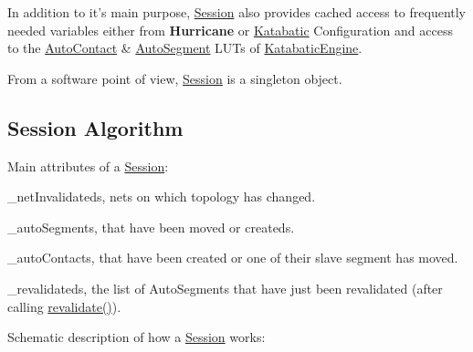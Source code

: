 In addition to it's main purpose, \hyperlink{classKatabatic_1_1Session}{Session} also provides cached access to frequently needed variables either from {\bf Hurricane} or \hyperlink{namespaceKatabatic}{Katabatic} Configuration and access to the \hyperlink{classKatabatic_1_1AutoContact}{Auto\-Contact} \& \hyperlink{classKatabatic_1_1AutoSegment}{Auto\-Segment} L\-U\-Ts of \hyperlink{classKatabatic_1_1KatabaticEngine}{Katabatic\-Engine}.

From a software point of view, \hyperlink{classKatabatic_1_1Session}{Session} is a singleton object.\hypertarget{classKatabatic_1_1Session_secSessionAlgo}{}\subsection{Session Algorithm}\label{classKatabatic_1_1Session_secSessionAlgo}
Main attributes of a \hyperlink{classKatabatic_1_1Session}{Session}\-:
\begin{DoxyItemize}
\item {\ttfamily \-\_\-net\-Invalidateds}, nets on which topology has changed.
\item {\ttfamily \-\_\-auto\-Segments}, that have been moved or createds.
\item {\ttfamily \-\_\-auto\-Contacts}, that have been created or one of their slave segment has moved.
\item {\ttfamily \-\_\-revalidateds}, the list of Auto\-Segments that have just been revalidated (after calling {\ttfamily \hyperlink{classKatabatic_1_1Session_a4da9e28432c1fdb0c754717487d9cc83}{revalidate()}}).
\end{DoxyItemize}

Schematic description of how a \hyperlink{classKatabatic_1_1Session}{Session} works\-:


